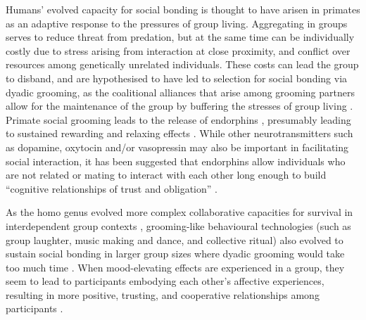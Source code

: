 \begin{CJK}{UTF8}{gbsn}

Humans' evolved capacity for social bonding is thought to have arisen in primates as an adaptive response to the pressures of group living.  Aggregating in groups serves to reduce threat from predation, but at the same time can be individually costly due to stress arising from interaction at close proximity, and conflict over resources among genetically unrelated individuals.  These costs can lead the group to disband, and are hypothesised to have led to selection for social bonding via dyadic grooming, as the coalitional alliances that arise among grooming partners allow for the maintenance of the group by buffering the stresses of group living \citep{Dunbar2012}.  Primate social grooming leads to the release of endorphins \citep[a type of endogenous opioid, see][]{Keverne1989}, presumably leading to sustained rewarding and relaxing effects \citep{Dunbar2010}.  While other neurotransmitters such as dopamine, oxytocin and/or vasopressin may also be important in facilitating social interaction, it has been suggested that endorphins allow individuals who are not related or mating to interact with each other long enough to build ``cognitive relationships of trust and obligation'' \citep[1839]{Dunbar2012}.

As the homo genus evolved more complex collaborative capacities for survival in interdependent group contexts \citep[see][]{Dunbar1998,Tomasello2012a}, grooming-like behavioural technologies (such as group laughter, music making and dance, and collective ritual) also evolved \citep[via processes of multi-level cultural group selection, see][]{Wilson2008} to sustain social bonding in larger group sizes where dyadic grooming would take too much time \citep{Dunbar2012,Tarr2014,Launay2016}.
When mood-elevating effects are experienced in a group, they seem to lead to participants embodying each other’s affective experiences, resulting in more positive, trusting, and cooperative relationships among participants \citep{Dunbar2012}.



\end{CJK}

